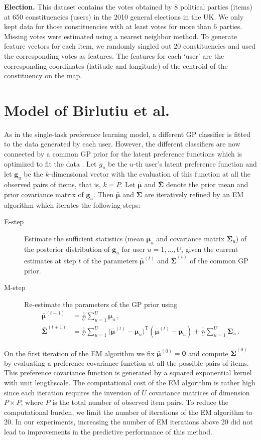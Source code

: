 \documentclass{article}
\begin{document}
{\bf Election.}
This dataset contains the votes obtained by 8 political parties (items) at 650 constituencies (users) in
the 2010 general elections in the UK.
We only kept data for those constituencies with at least votes for more than 6 parties. Missing votes
were estimated using a nearest neighbor method. To generate feature vectors for each item,
we randomly singled out 20 constituencies and used the corresponding votes as features.
The features for each `user' are the corresponding coordinates (latitude and longitude) of the centroid of the constituency on the map.

\section{Model of Birlutiu et al.}

As in the single-task preference learning model, a different GP classifier is
fitted to the data generated by each user. However, the different classifiers are now connected by a
common GP prior for the latent preference functions which is optimized to fit the data \cite{birlutiu2009}.
Let $g_u$ be the $u$-th user's latent preference function and let 
$\bm g_u$ be the $k$-dimensional vector with the evaluation of this function at all the observed pairs of items, that is, $k = P$.
Let $\bar{\bm \mu}$ and $\bar{\bm \Sigma}$ denote the prior mean and prior covariance matrix of $\bm g_u$.
Then $\bar{\bm \mu}$ and $\bar{\bm \Sigma}$ are iteratively refined by an EM algorithm which iterates the following steps:
\begin{description}
\item[E-step] Estimate the sufficient statistics (mean $\bm \mu_u$ and covariance matrix $\bm \Sigma_u$) of the posterior distribution of $\bm g_u$
for user $u=1,\ldots,U$, given the current estimates at step $t$ of the parameters $\bar{\bm \mu}^{(t)}$ and $\bar{\bm \Sigma}^{(t)}$ of the
common GP prior.
\item[M-step] Re-estimate the parameters of the GP prior using
\begin{align}
\bar{\bm \mu}^{(t+1)} & = \frac{1}{U} \sum_{u=1}^U \bm \mu_u\,,\nonumber\\
\bar{\bm \Sigma}^{(t+1)} & = \frac{1}{U} \sum_{u=1}^U \bm (\bar{\bm \mu}^{(t)} - \bm \mu_u)^\text{T} (\bar{\bm \mu}^{(t)} - \bm \mu_u) + 
\frac{1}{U}\sum_{u=1}^U \bm \Sigma_u \,.\nonumber
\end{align}
\end{description}
On the first iteration of the EM algorithm we fix $\bar{\bm \mu}^{(0)} = \bm 0$ and compute $\bar{\bm \Sigma}^{(0)}$ 
by evaluating a preference covariance function at all the possible pairs of items. This preference covariance function
is generated by a squared exponential kernel with unit lengthscale. 
The computational cost of the EM algorithm is rather high
since each iteration requires the inversion of $U$ covariance matrices of dimension $P \times P$,
where $P$ is the total number of observed item pairs. To reduce the computational burden, we limit
the number of iterations of the EM algorithm to 20. In our experiments, increasing the number of EM iterations 
above 20 did not lead to improvements in the predictive performance of this method.
\end{document}
